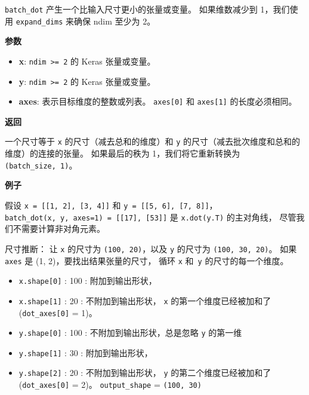 \texttt{batch\_dot} 产生一个比输入尺寸更小的张量或变量。 如果维数减少到
1，我们使用 \texttt{expand\_dims} 来确保 ndim 至少为 2。

\textbf{参数}

\begin{itemize}
\tightlist
\item
  \textbf{x}: \texttt{ndim\ \textgreater{}=\ 2} 的 Keras 张量或变量。
\item
  \textbf{y}: \texttt{ndim\ \textgreater{}=\ 2} 的 Keras 张量或变量。
\item
  \textbf{axes}: 表示目标维度的整数或列表。 \texttt{axes{[}0{]}} 和
  \texttt{axes{[}1{]}} 的长度必须相同。
\end{itemize}

\textbf{返回}

一个尺寸等于 \texttt{x} 的尺寸（减去总和的维度）和 \texttt{y}
的尺寸（减去批次维度和总和的维度）的连接的张量。 如果最后的秩为
1，我们将它重新转换为 \texttt{(batch\_size,\ 1)}。

\textbf{例子}

假设 \texttt{x\ =\ {[}{[}1,\ 2{]},\ {[}3,\ 4{]}{]}} 和
\texttt{y\ =\ {[}{[}5,\ 6{]},\ {[}7,\ 8{]}{]}}，
\texttt{batch\_dot(x,\ y,\ axes=1)\ =\ {[}{[}17{]},\ {[}53{]}{]}} 是
\texttt{x.dot(y.T)} 的主对角线， 尽管我们不需要计算非对角元素。

尺寸推断： 让 \texttt{x} 的尺寸为 \texttt{(100,\ 20)}，以及 \texttt{y}
的尺寸为 \texttt{(100,\ 30,\ 20)}。 如果 \texttt{axes} 是 (1,
2)，要找出结果张量的尺寸， 循环 \texttt{x} 和~\texttt{y}
的尺寸的每一个维度。

\begin{itemize}
\tightlist
\item
  \texttt{x.shape{[}0{]}} : 100 : 附加到输出形状，
\item
  \texttt{x.shape{[}1{]}} : 20 : 不附加到输出形状， \texttt{x}
  的第一个维度已经被加和了 (\texttt{dot\_axes{[}0{]}} = 1)。
\item
  \texttt{y.shape{[}0{]}} : 100 : 不附加到输出形状，总是忽略 \texttt{y}
  的第一维
\item
  \texttt{y.shape{[}1{]}} : 30 : 附加到输出形状，
\item
  \texttt{y.shape{[}2{]}} : 20 : 不附加到输出形状， \texttt{y}
  的第二个维度已经被加和了 (\texttt{dot\_axes{[}0{]}} = 2)。
  \texttt{output\_shape} = \texttt{(100,\ 30)}
\end{itemize}

